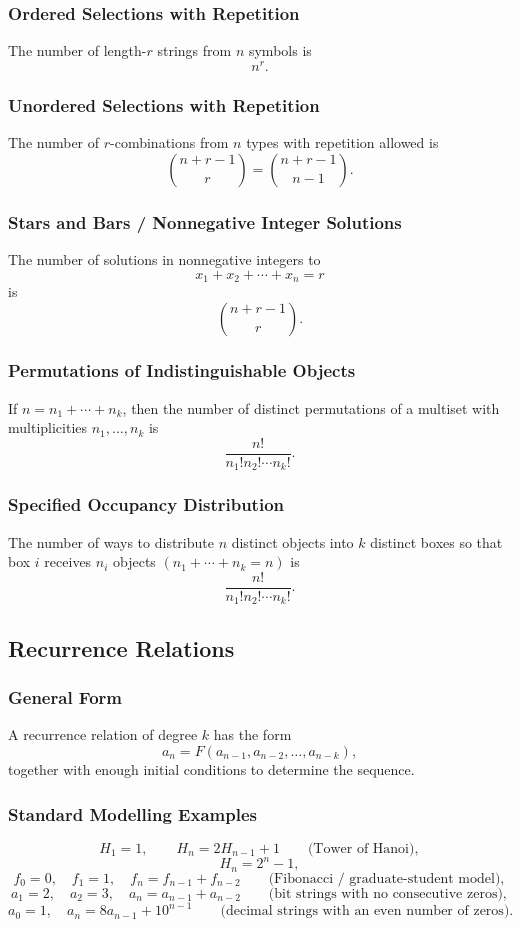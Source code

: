 \documentclass[12pt]{article}
\begin{document}
\subsubsection{Ordered Selections with Repetition}
The number of length-\(r\) strings from \(n\) symbols is
\[
n^r.
\]

\subsubsection{Unordered Selections with Repetition}
The number of \(r\)-combinations from \(n\) types with repetition allowed is
\[
\binom{n+r-1}{r}=\binom{n+r-1}{n-1}.
\]

\subsubsection{Stars and Bars / Nonnegative Integer Solutions}
The number of solutions in nonnegative integers to
\[
x_1+x_2+\cdots+x_n=r
\]
is
\[
\binom{n+r-1}{r}.
\]

\subsubsection{Permutations of Indistinguishable Objects}
If \(n=n_1+\cdots+n_k\), then the number of distinct permutations of a multiset with multiplicities \(n_1,\dots,n_k\) is
\[
\frac{n!}{n_1!n_2!\cdots n_k!}.
\]

\subsubsection{Specified Occupancy Distribution}
The number of ways to distribute \(n\) distinct objects into \(k\) distinct boxes so that box \(i\) receives \(n_i\) objects \((n_1+\cdots+n_k=n)\) is
\[
\frac{n!}{n_1!n_2!\cdots n_k!}.
\]

\subsection{Recurrence Relations}

\subsubsection{General Form}
A recurrence relation of degree \(k\) has the form
\[
a_n=F(a_{n-1},a_{n-2},\dots,a_{n-k}),
\]
together with enough initial conditions to determine the sequence.

\subsubsection{Standard Modelling Examples}
\[
H_1=1,\qquad H_n=2H_{n-1}+1
\qquad\text{(Tower of Hanoi)},
\]
\[
H_n=2^n-1,
\]
\[
f_0=0,\quad f_1=1,\quad f_n=f_{n-1}+f_{n-2}
\qquad\text{(Fibonacci / graduate-student model)},
\]
\[
a_1=2,\quad a_2=3,\quad a_n=a_{n-1}+a_{n-2}
\qquad\text{(bit strings with no consecutive zeros)},
\]
\[
a_0=1,\quad a_n=8a_{n-1}+10^{n-1}
\qquad\text{(decimal strings with an even number of zeros)}.
\]
\end{document}
